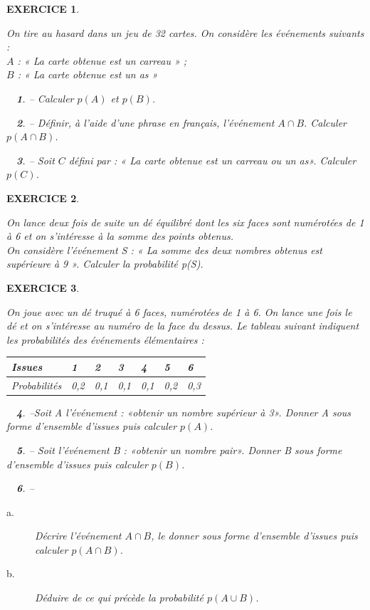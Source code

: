 \documentclass[a4paper]{article}   %
\renewcommand{\(}{\left(}
\renewcommand{\)}{\right)}
\newtheorem{ques}{~}
\newenvironment{qu}{\begin{ques}--} {\end{ques}}
\newtheorem{EXO}{\large EXERCICE }
\newenvironment{EX}   { \setcounter{ques}{0} \begin{EXO} \hrulefill ~\vspace{0.3cm}

\normalfont}    {\end{EXO} \medskip}
\begin{document}
\begin{EX}		

On tire au hasard dans un jeu de 32 cartes. On considère les événements suivants : \\
$A$ : « La carte obtenue est un carreau » ;\\
$B$ : « La carte obtenue est un as »
\begin{qu} Calculer $p(A)$ et $p(B)$.
\end{qu}
\begin{qu} Définir, à l’aide d’une phrase en français, l’événement $A\cap B$. Calculer $p(A\cap B)$.
\end{qu}
\begin{qu} Soit $C$ défini par : « La carte obtenue est un carreau ou un as». Calculer $p(C)$.
\end{qu}


\end{EX}
\begin{EX}

On lance deux fois de suite un dé équilibré dont les six faces sont numérotées de 1 à 6 et on s’intéresse à la somme des points obtenus. \\

On considère l’événement S : « La somme des deux nombres obtenus est supérieure à 9 ».
Calculer la probabilité p(S).


\end{EX}
\begin{EX}

On joue avec un dé truqué à 6 faces, numérotées de 1 à 6.
On lance une fois le dé et on s’intéresse au numéro de la face du dessus.
Le tableau suivant indiquent les probabilités des événements élémentaires :

\begin{center}
\begin{tabular}{|p{1.8cm}| p{0.7cm}| p{0.7cm}| p{0.7cm}| p{0.7cm}| p{0.7cm}| p{0.7cm}|}		
\hline							
Issues & 1&2&3&4&5&6\\
\hline
Probabilités & 0,2& 0,1 &0,1 &0,1& 0,2& 0,3\\
\hline
\end{tabular}
\end{center}

\begin{qu}Soit A l’événement : «obtenir un nombre supérieur à 3».
Donner A sous forme d’ensemble d’issues puis calculer $p(A)$.
\end{qu}
\begin{qu} Soit l’événement B : «obtenir un nombre pair».
Donner B sous forme d’ensemble d’issues puis calculer $p(B)$.
\end{qu}
\begin{qu} \begin{description}
\item [a.] Décrire l'événement $A \cap B$, le donner sous forme d’ensemble d’issues puis calculer $p(A\cap B)$.
\item [b.] Déduire de ce qui précède la probabilité $p(A\cup B)$.
\end{description}
\end{qu}

\end{EX}
\end{document}
